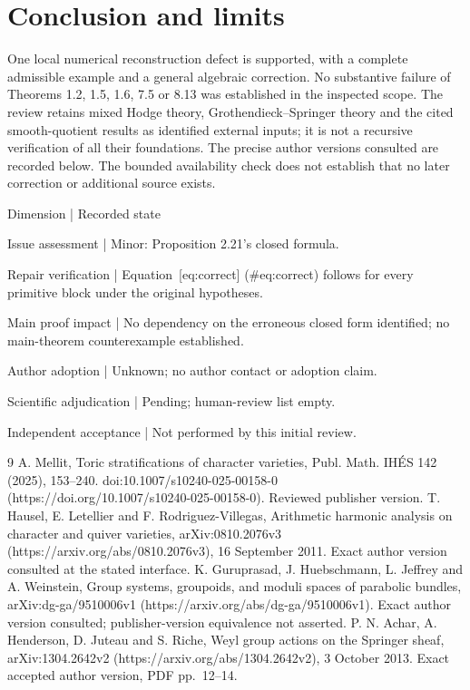 \documentclass[10pt]{article}
\begin{document}
\section*{Conclusion and limits}
One local numerical reconstruction defect is supported, with a complete admissible example and a general algebraic correction. No substantive failure of Theorems 1.2, 1.5, 1.6, 7.5 or 8.13 was established in the inspected scope. The review retains mixed Hodge theory, Grothendieck–Springer theory and the cited smooth-quotient results as identified external inputs; it is not a recursive verification of all their foundations. The precise author versions consulted are recorded below. The bounded availability check does not establish that no later correction or additional source exists.\par
Dimension | Recorded state\par
Issue assessment | Minor: Proposition 2.21’s closed formula.\par
Repair verification | Equation [eq:correct] (\#eq:correct) follows for every primitive block under the original hypotheses.\par
Main proof impact | No dependency on the erroneous closed form identified; no main-theorem counterexample established.\par
Author adoption | Unknown; no author contact or adoption claim.\par
Scientific adjudication | Pending; human-review list empty.\par
Independent acceptance | Not performed by this initial review.\par
9 A. Mellit, Toric stratifications of character varieties, Publ. Math. IHÉS 142 (2025), 153–240. doi:10.1007/s10240-025-00158-0 (https://doi.org/10.1007/s10240-025-00158-0). Reviewed publisher version. T. Hausel, E. Letellier and F. Rodriguez-Villegas, Arithmetic harmonic analysis on character and quiver varieties, arXiv:0810.2076v3 (https://arxiv.org/abs/0810.2076v3), 16 September 2011. Exact author version consulted at the stated interface. K. Guruprasad, J. Huebschmann, L. Jeffrey and A. Weinstein, Group systems, groupoids, and moduli spaces of parabolic bundles, arXiv:dg-ga/9510006v1 (https://arxiv.org/abs/dg-ga/9510006v1). Exact author version consulted; publisher-version equivalence not asserted. P. N. Achar, A. Henderson, D. Juteau and S. Riche, Weyl group actions on the Springer sheaf, arXiv:1304.2642v2 (https://arxiv.org/abs/1304.2642v2), 3 October 2013. Exact accepted author version, PDF pp. 12–14.\par
\end{document}

